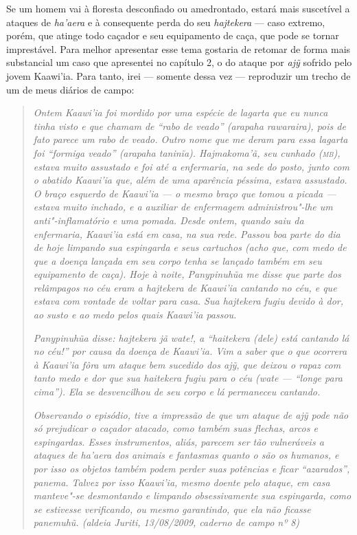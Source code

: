 Se um homem vai à floresta desconfiado ou amedrontado, estará mais
suscetível a ataques de \emph{ha'aera} e à consequente perda do seu
\emph{hajtekera} --- caso extremo, porém, que atinge todo caçador e seu
equipamento de caça, que pode se tornar imprestável. Para melhor
apresentar esse tema gostaria de retomar de forma mais substancial um
caso que apresentei no capítulo 2, o do ataque por \emph{ajỹ} sofrido
pelo jovem Kaawi'ia. Para tanto, irei --- somente dessa vez --- reproduzir
um trecho de um de meus diários de campo:

\begin{quote}
\emph{Ontem Kaawi'ia foi mordido por uma espécie de lagarta que eu nunca
tinha visto e que chamam de ``rabo de veado'' (arapaha rawaraira), pois de
fato parece um rabo de veado. Outro nome que me deram para essa lagarta
foi ``formiga veado'' (arapaha taninĩa). Hajmakoma'ã, seu cunhado (\textsc{mb}),
estava muito assustado e foi até a enfermaria, na sede do posto, junto
com o abatido Kaawi'ia que, além de uma aparência péssima, estava
assustado. O braço esquerdo de Kaawi'ia --- o mesmo braço que tomou a
picada --- estava muito inchado, e a auxiliar de enfermagem
administrou"-lhe um anti"-inflamatório e uma pomada. Desde ontem, quando
saiu da enfermaria, Kaawi'ia está em casa, na sua rede. Passou boa parte
do dia de hoje limpando sua espingarda e seus cartuchos (acho que, com
medo de que a doença lançada em seu corpo tenha se lançado também em seu
equipamento de caça). Hoje à noite, Panypinuhũa me disse que parte dos
relâmpagos no céu eram a hajtekera de Kaawi'ia cantando no céu, e que
estava com vontade de voltar para casa. Sua hajtekera fugiu devido à
dor, ao susto e ao medo pelos quais Kaawi'ia passou.}

\emph{Panypinuhũa disse: hajtekera jã wate!, a ``haitekera (dele) está
cantando lá no céu!'' por causa da doença de Kaawi'ia. Vim a saber que o
que ocorrera à Kaawi'ia fôra um ataque bem sucedido dos ajỹ, que deixou
o rapaz com tanto medo e dor que sua haitekera fugiu para o céu (wate ---
``longe para cima''). Ela se desvencilhou de seu corpo e lá permaneceu
cantando.}

\emph{Observando o episódio, tive a impressão de que um ataque de ajỹ
pode não só prejudicar o caçador atacado, como também suas flechas,
arcos e espingardas. Esses instrumentos, aliás, parecem ser tão
vulneráveis a ataques de ha'aera dos animais e fantasmas quanto o são os
humanos, e por isso os objetos também podem perder suas potências e
ficar ``azarados'', panema. Talvez por isso Kaawi'ia, mesmo doente pelo
ataque, em casa manteve"-se desmontando e limpando obsessivamente sua
espingarda, como se estivesse verificando, ou mesmo garantindo, que ela
não ficasse panemuhũ. (aldeia Juriti, 13/08/2009, caderno de campo nº
8)}
\end{quote}

